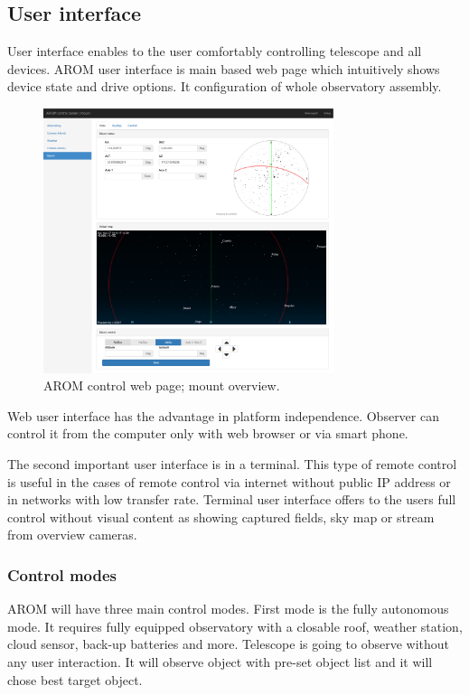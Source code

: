 \documentclass{ibws_template}
\begin{document}
\subsection{User interface}
User interface enables to the user comfortably controlling telescope and all devices. AROM user interface is main based web page which intuitively shows device state and drive options. It configuration of whole observatory assembly.

\begin{figure}[h!]
\begin{center}
\includegraphics[width=85mm]{img/arom_ui.eps}
\caption{AROM control web page; mount overview.} 
\end{center}
\end{figure}
\pagebreak

Web user interface has the advantage in platform independence. Observer can control it from the computer only with web browser or via smart phone. 

The second important user interface is in a terminal. This type of remote control is useful in the cases of remote control via internet without public IP address or in networks with low transfer rate. Terminal user interface offers to the users full control without visual content as showing captured fields, sky map or stream from overview cameras.

\subsubsection{Control modes}
AROM will have three main control modes. First mode is the fully autonomous mode. It requires fully equipped observatory with a closable roof, weather station, cloud sensor, back-up batteries and more. Telescope is going to observe without any user interaction. It will observe object with pre-set object list and it will chose best target object. 
\end{document}
